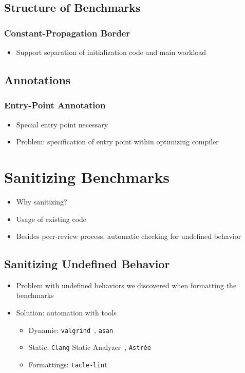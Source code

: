 \documentclass[a4paper,USenglish]{lites}
\begin{document}
\subsection{Structure of Benchmarks}

\subsubsection*{Constant-Propagation Border}
\begin{itemize}
  \item Support separation of initialization code and main workload
\end{itemize}

\subsection{Annotations}
\subsubsection*{Entry-Point Annotation}
\begin{itemize}
  \item Special entry point necessary
  \item Problem: specification of entry point within optimizing compiler
\end{itemize}

\section{Sanitizing Benchmarks}

\begin{itemize}
  \item Why sanitizing?
  \item Usage of existing code
  \item Besides peer-review process, automatic checking for undefined behavior
\end{itemize}

\subsection{Sanitizing Undefined Behavior}
\begin{itemize}
  \item Problem with undefined behaviors we discovered when formatting the benchmarks
  \item Solution: automation with tools
  \begin{itemize}
    \item Dynamic: \texttt{valgrind}~\cite{nethercote:2007:acm-sigplan}, \texttt{asan}~\cite{serebryany:2012:atc}
    \item Static: \texttt{Clang} Static Analyzer~\cite{clang-static-analyzer:website}, \texttt{Astr\'ee}~\cite{cousot:2005:esop}
    \item Formattings: \texttt{tacle-lint}
  \end{itemize}
\end{itemize}
\end{document}
